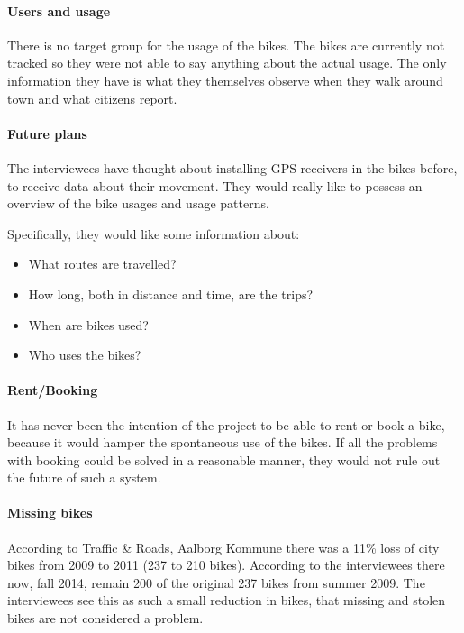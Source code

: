 \paragraph{Users and usage}
There is no target group for the usage of the bikes.
The bikes are currently not tracked so they were not able to say anything about the actual usage.
The only information they have is what they themselves observe when they walk around town and what citizens report.

\paragraph{Future plans}
The interviewees have thought about installing GPS receivers in the bikes before, to receive data about their movement.
They would really like to possess an overview of the bike usages and usage patterns. 

Specifically, they would like some information about:
\begin{itemize}
\item What routes are travelled?
\item How long, both in distance and time, are the trips?
\item When are bikes used?
\item Who uses the bikes?
\end{itemize}

\paragraph{Rent/Booking}
It has never been the intention of the \citybike project to be able to rent or book a bike, because it would hamper the spontaneous use of the bikes.
If all the problems with booking could be solved in a reasonable manner, they would not rule out the future of such a system.

\paragraph{Missing bikes}
According to Traffic \& Roads, Aalborg Kommune\cite{cykelplanlaegning} there was a 11\% loss of city bikes from 2009 to 2011 (237 to 210 bikes).
According to the interviewees there now, fall 2014, remain 200 of the original 237 bikes from summer 2009.
The interviewees see this as such a small reduction in bikes, that missing and stolen bikes are not considered a problem.

